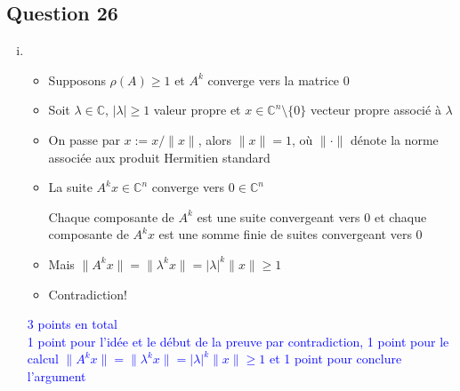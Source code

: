 \documentclass[11pt, a4paper, oneside]{article}
\newcommand{\indice}[1]{{\scriptsize \color{RubineRed} {#1}}}
\begin{document}
\subsection*{Question 26}
\begin{enumerate}[i)]
\item
  \begin{itemize}
  \item Supposons $\rho(A) \geq 1$ et $A^k$ converge vers la matrice $0$
  \item Soit  $\lambda ∈ℂ$, $|λ|≥1$  valeur propre et  $x \in \mathbb{C}^n \setminus \{0\}$ vecteur propre  associé à $\lambda$
  \item On passe par $x := x / \|x\|$, alors $\|x\| = 1$, où $\| \cdot\|$
    dénote la norme associée aux produit Hermitien standard    
  \item La suite  $A^k x ∈ ℂ^n$ converge vers $0 ∈ ℂ^n$
    
    \indice{Chaque composante de $A^k$ est une suite convergeant vers $0$ et chaque composante de $A^k x$ est une somme finie de suites convergeant vers $0$} 
  \item Mais $\|A^k x\|  = \|λ^k x\|  = |λ|^k \|x\| ≥ 1$
  \item Contradiction! \\
  \end{itemize}
\textcolor{blue}{3 points en total \\ 1 point pour l'idée et le début de la preuve par contradiction, 1 point pour le calcul  $\|A^k x\|  = \|λ^k x\|  = |λ|^k \|x\| ≥ 1$  et 1 point pour conclure l'argument} 


\end{enumerate}
\end{document}
